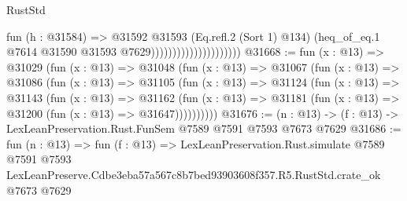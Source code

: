 \begin{lexlean}{RustStd}
\begin{coremodule}
                                          fun (h : @31584) =>
                                          @31592
                                            @31593
                                            (Eq.refl.{2} (Sort 1) @134)
                                            (heq_of_eq.{1}
                                              @7614
                                              @31590
                                              @31593
                                              @7629)))))))))))))))))))))
@31668 := fun (x : @13) =>
  @31029
    (fun (x : @13) =>
    @31048
      (fun (x : @13) =>
      @31067
        (fun (x : @13) =>
        @31086
          (fun (x : @13) =>
          @31105
            (fun (x : @13) =>
            @31124
              (fun (x : @13) =>
              @31143
                (fun (x : @13) =>
                @31162
                  (fun (x : @13) =>
                  @31181 (fun (x : @13) => @31200 (fun (x : @13) => @31647))))))))))
@31676 := (n : @13) -> (f : @13) -> LexLeanPreservation.Rust.FunSem @7589 @7591 @7593 @7673 @7629
@31686 := fun (n : @13) =>
  fun (f : @13) =>
  LexLeanPreservation.Rust.simulate
    @7589
    @7591
    @7593
    LexLeanPreserve.Cdbe3eba57a567c8b7bed93903608f357.R5.RustStd.crate_ok
    @7673
    @7629
\end{coremodule}
\end{lexlean}
